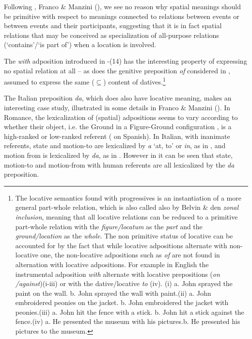 \documentclass[output=paper,colorlinks,citecolor=brown]{./langscibook}
\begin{document}
Following \citet{ManziniSavoia2011}, Franco \& Manzini (\citeyear{FrancoManzini2017Gen, FrancoManzini2017Ins}), we see no reason why spatial meanings should be primitive with respect to meanings connected to relations between events or between events and their participants, suggesting that it is in fact spatial relations that may be conceived as specialization of all-purpose relations (‘contains’/‘is part of’) when a location is involved. 

The \textit{with} adposition introduced in -(14) has the interesting property of expressing no spatial relation at all \citep{Levinson2011} – as does the genitive preposition \textit{of} considered in , assumed to express the same (${\subseteq}$) content of datives.\footnote{The locative semantics found with progressives is an instantiation of a more general part-whole relation, which is also called also by Belvin \& den \citet[170]{Dikken1997} \textit{zonal inclusion}, meaning that all locative relations can be reduced to a primitive part-whole relation with the \textit{figure/locatum} as the \textit{part} and the \textit{ground/location} as the \textit{whole}. The non primitive status of locative can be accounted for by the fact that while locative adpositions alternate with non-locative one, the non-locative adpositions such as \textit{of} are not found in alternation with locative adpositions. For example in English the instrumental adposition \textit{with} alternate with locative prepositions (\textit{on /against})(i-iii) or with the dative/locative \textit{to} (iv). (i) a.   John sprayed the paint on the wall. b.   John sprayed the wall with paint.(ii)   a.   John embroidered peonies on the jacket. b.   John embroidered the jacket with peonies.(iii)  a.   John hit the fence with a stick. b.   John hit a stick against the fence.(iv)   a.   He presented the museum with his pictures.b.    He presented his pictures to the museum.} 

The Italian preposition \textit{da}, which does also have locative meaning, makes an interesting case study, illustrated in some details in Franco \& Manzini (\citeyear{FrancoManzini2017Gen, FrancoManzini2017Ins}). In Romance, the lexicalization of (spatial) adpositions seems to vary according to whether their object, i.e. the Ground in a Figure-Ground configuration \citep{Svenonius2006}, is a high-ranked or low-ranked referent (\citealt{Fábregas2015} on Spanish). In Italian, with inanimate referents, state and motion-to are lexicalized by \textit{a} ‘at, to’ or \textit{in}, as in , and motion from is lexicalized by \textit{da}, as in . However in  it can be seen that state, motion-to and motion-from with human referents are all lexicalized by the \textit{da} preposition. 
\end{document}
